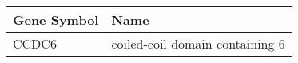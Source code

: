 \begin{tabular}{ll}
\toprule
Gene Symbol &                            Name \\
\midrule
      CCDC6 & coiled-coil domain containing 6 \\
\bottomrule
\end{tabular}
